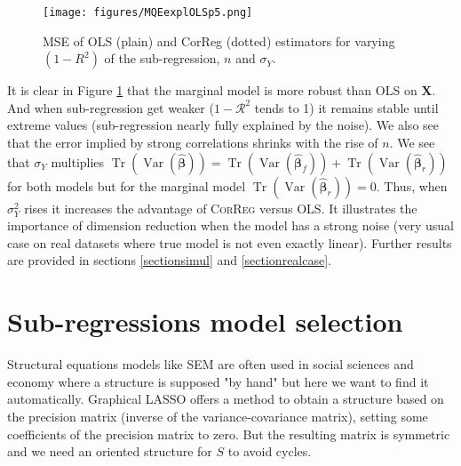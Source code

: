 \documentclass[11pt,a4paper]{article}
\begin{document}
\begin{figure}[h!]
	\texttt{[image: figures/MQEexplOLSp5.png]}\label{MQE1}
	\caption{MSE of OLS (plain) and CorReg (dotted) estimators for varying $(1-R^2)$ of the sub-regression, $n$ and $\sigma_Y$.}
\end{figure} 
It is clear in Figure \ref{MQE1} that the marginal model is more robust than \textsc{OLS} on $\boldsymbol{X}$. And when sub-regression get weaker ($1-\mathcal{R}^2$ tends to 1) it remains stable until extreme values (sub-regression nearly fully explained by the noise). We also see that the error implied by strong correlations shrinks with the rise of $n$. 
We see that $\sigma_Y$ multiplies $\operatorname{Tr}(\operatorname{Var}(\hat{\boldsymbol{\beta}}))=\operatorname{Tr}(\operatorname{Var}(\hat{\boldsymbol{\beta}}_{f}))+\operatorname{Tr}(\operatorname{Var}(\hat{\boldsymbol{\beta}}_{r}))$ for both models but for the marginal model $\operatorname{Tr}(\operatorname{Var}(\hat{\boldsymbol{\beta}}_{r}))=0$.
 Thus, when $\sigma_Y^2$ rises it increases the advantage of \textsc{CorReg} versus \textsc{OLS}. It illustrates the importance of dimension reduction when the model has a strong noise (very usual case on real datasets where true model is not even exactly linear). Further results are provided in sections \ref{sectionsimul} and \ref{sectionrealcase}.

	
\section{Sub-regressions model selection}	
Structural equations models like \textsc{SEM} are often used in social sciences and economy where a structure is supposed "by hand" but here we want to find it automatically. Graphical LASSO \cite{friedman2008sparse} offers a method to obtain a structure based on the precision matrix (inverse of the variance-covariance matrix), setting some coefficients of the precision matrix to zero. But the resulting matrix is symmetric and we need an oriented structure for $S$ to avoid cycles.
\end{document}
